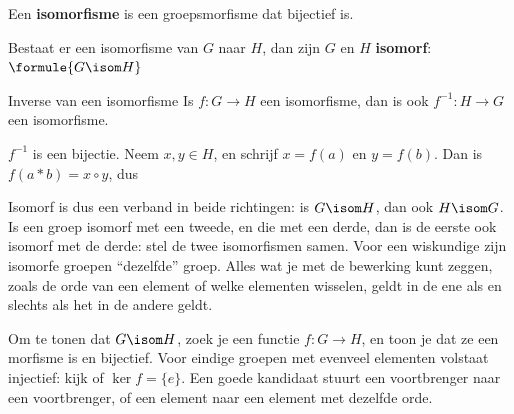 \begin{theorie}
Een \textbf{\textcolor{accent}{isomorfisme}} is een groepsmorfisme dat bijectief is.

\vspace{1mm}
Bestaat er een isomorfisme van $G$ naar $H$, dan zijn $G$ en $H$ \textbf{\textcolor{accent}{isomorf}}: \quad $\formule{G \isom H}$

\begin{stelling}{Inverse van een isomorfisme}
Is $f \colon G \to H$ een isomorfisme, dan is ook $f^{-1} \colon H \to G$ een isomorfisme.
\end{stelling}

\begin{bewijs}
$f^{-1}$ is een bijectie. Neem $x, y \in H$, en schrijf $x = f(a)$ en $y = f(b)$. Dan is $f(a \ast b) = x \circ y$, dus
\end{bewijs}
\end{theorie}

Isomorf is dus een verband in beide richtingen: is $G \isom H$, dan ook $H \isom G$. Is een groep isomorf met een tweede, en die met een derde, dan is de eerste ook isomorf met de derde: stel de twee isomorfismen samen. Voor een wiskundige zijn isomorfe groepen ``dezelfde'' groep. Alles wat je met de bewerking kunt zeggen, zoals de orde van een element of welke elementen wisselen, geldt in de ene als en slechts als het in de andere geldt.


\begin{werkwijze}
Om te tonen dat $G \isom H$, zoek je een functie $f \colon G \to H$, en toon je dat ze een morfisme is en bijectief. Voor eindige groepen met evenveel elementen volstaat injectief: kijk of $\ker f = \{e\}$. Een goede kandidaat stuurt een voortbrenger naar een voortbrenger, of een element naar een element met dezelfde orde.
\end{werkwijze}

